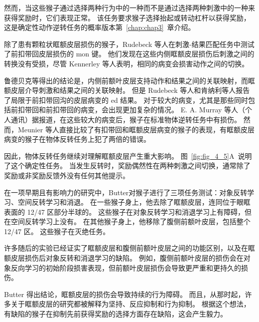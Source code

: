 然而，当这些猴子通过选择两种行为中的一种而不是通过选择两种刺激中的一种来获得奖励时，它们表现正常。
该任务要求猴子选择抬起或转动杠杆以获得奖励，这是确定性动作逆转任务的概率版本第~\ref{chap:chap3}~章介绍。\par


除了患有颗粒状眶额皮层损伤的猴子，Rudebeck 等人在刺激-结果匹配任务中测试了前扣带回皮层损伤的 mon 键。
他们发现在这些内侧眶额皮层损伤后刺激之间的转换没有受损，尽管 Kennerley 等人\cite{kennerley2006optimal}表明，相同的病变会损害动作之间的切换。\par



鲁德贝克等得出的结论是，内侧前额叶皮层支持动作和结果之间的关联映射，而眶额皮层介导刺激和结果之间的关联映射。
但是 Rudebeck 等人和肯纳利等人报告了局限于前扣带回沟的皮层病变的 ed 结果。
对于较大的病变，尤其是那些同时包括前扣带回和前扣带回的病变，会出现更加复杂的情况。
E. A. Murray 等人（个人通讯）据报道，在这些较大的病变后，猴子在标准物体逆转任务中有损伤。
然而，Meunier 等人\cite{meunier1997effects}直接比较了有扣带回和眶额皮层病变的猴子的表现，有眶额皮层病变的猴子在物体反转任务上犯了两倍的错误。  \par


因此，物体反转任务继续对理解眶额皮层产生重大影响。
图~\ref{fig:fig_4_5}A~说明了这个确定性任务。
当发生反转时，奖励偶然性在两种刺激之间切换，通常除了奖励或非奖励反馈外没有任何其他提示。\par


在一项早期且有影响力的研究中，Butter\cite{butters1969retention}对猴子进行了三项任务测试：对象反转学习、空间反转学习和消退。
在一些猴子身上，他去除了眶额皮层，连同位于眼眶表面的 12/47 区部分半球的。
这些猴子在对象反转学习和消退学习上有障碍，但在空间反转学习上没有。
在其他猴子身上，他移除了腹侧前额叶皮层，包括整个 12/47 区。
这些猴子在灭绝任务。\par


许多随后的实验已经证实了眶额皮层和腹侧前额叶皮层之间的功能区别，以及在眶额皮层损伤后对象反转和消退学习的缺陷\cite{dias1997dissociable,izquierdo2004bilateral}。
例如，腹侧前额叶皮层的损伤会在对象反向学习的初始阶段损害表现，但前额叶皮层损伤会导致更严重和更持久的损伤\cite{rygula2010differential}。\par


Butter 得出结论，眶额皮层的损伤会导致持续的行为障碍。
而且，从那时起，许多关于眶额皮层的研究都被解释为坚持、反应抑制和行为抑制\cite{roberts2000inhibitory}。
根据这个想法，有缺陷的猴子在抑制先前获得奖励的选择方面存在缺陷，这会产生毅力。\par


